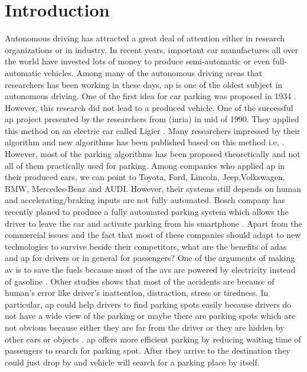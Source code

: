 \chapter{Introduction}\label{chapter:introduction}
Autonomous driving has attracted a great deal of attention either in research organizations or in industry. In recent years, important car manufactures all over the world have invested lots of money to produce semi-automatic or even full-automatic vehicles. Among many of the autonomous driving areas that researchers has been working in these days, \acrfull{ap} is one of the oldest subject in autonomous driving. One of the first idea for car parking was proposed  in 1934 \cite{firsParking}. However, this research did not lead to a produced vehicle. One of the successful \acrshort{ap} project presented by the researchers from (\acrfull{inria}) in mid of 1990. They applied this method on an electric car called Ligier \cite{parkingManeuver}. Many researchers impressed by their algorithm and new algorithms has been published based on this method i.e, \cite{twoCircles}. However, most of the parking algorithms has been proposed theoretically and not all of them practically used for parking. Among companies who applied \acrlong{ap} in their produced cars, we can point to Toyota, Ford, Lincoln, Jeep,Volkswagen, BMW, Mercedes-Benz and AUDI. However, their systems still depends on human and accelerating/braking inputs are not fully automated. Bosch company has recently planed to produce a fully automated parking system which allows the driver to leave the car and activate parking from his smartphone \cite{usConference}. Apart from the commercial issues and the fact that most of these companies should adapt to new technologies to survive beside their competitors, what are the benefits of \acrshort{adas} and \acrshort{ap} for drivers or in general for passengers? One of the arguments of making \acrfull{av} is to save the fuels because most of the \acrshort{av}s are powered by electricity instead of gasoline \cite{otherThesis}. Other studies shows that most of the accidents are because of human's error like driver's inattention, distraction, stress or tiredness. In particular, \acrshort{ap} could help drivers to find parking spots easily because drivers do not have a wide view of the parking or maybe there are parking spots which are not obvious because either they are far from the driver or they are hidden by other cars or objects \cite{detection-with-CNN}. \acrshort{ap} offers more efficient parking by reducing waiting time of passengers to search for parking spot. After they arrive to the destination they could just drop by and vehicle will search for a parking place by itself. \\
